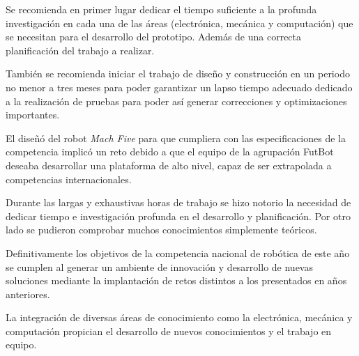 \documentclass[10pt,twocolumn,legalpaper,draft]{article}
\begin{document}
\vspace{0,8em}

\centerline{\Large{\textbf{}}}
\vspace{0,8em}

Se recomienda en primer lugar dedicar el tiempo suficiente a la profunda investigación en cada una de las áreas (electrónica, mecánica y computación) que se necesitan para el desarrollo del prototipo. Además de una correcta planificación del trabajo a realizar.\newline

También se recomienda iniciar el trabajo de diseño y construcción en un periodo no menor a tres meses para poder garantizar un lapso tiempo adecuado dedicado a la realización de pruebas para poder así generar correcciones y optimizaciones importantes.\newline
\vspace{0,8em}

\centerline{\Large{\textbf{}}}
\vspace{0,8em}

El diseñó del robot \emph{Mach Five} para que cumpliera con las especificaciones de la competencia implicó un reto debido a que el equipo de la agrupación FutBot deseaba desarrollar una plataforma de alto nivel, capaz de ser extrapolada a competencias internacionales.\newline

Durante las largas y exhaustivas horas de trabajo se hizo notorio la necesidad de dedicar tiempo e investigación profunda en el desarrollo y planificación. Por otro lado se pudieron comprobar muchos conocimientos simplemente teóricos.\newline

Definitivamente los objetivos de la competencia nacional de robótica de este año se cumplen al generar un ambiente de innovación y desarrollo de nuevas soluciones mediante la implantación de retos distintos a los presentados en años anteriores.\newline

La integración de diversas áreas de conocimiento como la electrónica, mecánica y computación propician el desarrollo de nuevos conocimientos y el trabajo en equipo.\newline

\vspace{0,8em}
\end{document}
